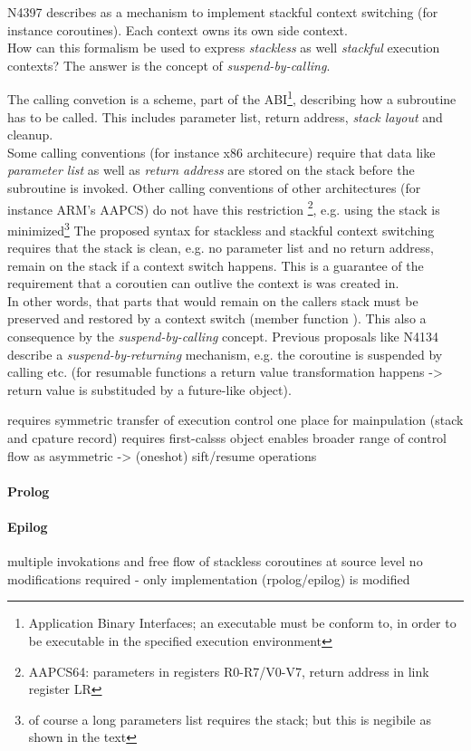 N4397\cite{N4397} describes \ectx as a mechanism to implement stackful context
switching (for instance coroutines). Each context owns its own side context.\\
How can this formalism be used to express \emph{stackless} as well
\emph{stackful} execution contexts? The answer is the concept of
\emph{suspend-by-calling}.

The calling convetion is a scheme, part of the ABI\footnote{Application Binary
Interfaces; an executable must be conform to, in order to be executable in the
specified execution environment}, describing how a subroutine has to be called.
This includes parameter list, return address, \emph{stack layout} and
cleanup.\\
Some calling conventions (for instance x86 architecure) require that data like
\emph{parameter list} as well as \emph{return address} are stored on the
stack before the subroutine is invoked. Other calling conventions of other
architectures (for instance ARM's AAPCS) do not have this restriction
\footnote{AAPCS64: parameters in registers R0-R7/V0-V7, return address in link
register LR}, e.g. using the stack is minimized\footnote{of course a long
parameters list requires the stack; but this is negibile as shown in the text}
\newline
The proposed syntax for stackless and stackful context switching requires that
the stack is clean, e.g. no parameter list and no return address, remain on the
stack if a context switch happens. This is a guarantee of the requirement that
a coroutien can outlive the context is was created in.\\
In other words, that parts that would remain on the callers stack must be
preserved and restored by a context switch (member function \ectxop). This also
a consequence by the \emph{suspend-by-calling} concept. Previous proposals like
N4134\cite{N4134} describe a \emph{suspend-by-returning} mechanism, e.g. the
coroutine is suspended by calling \yield etc. (for resumable functions a return
value transformation happens -> return value is substituded by a future-like
object).

requires symmetric transfer of execution control
one place for mainpulation (stack and cpature record)
requires first-calsss object
enables broader range of control flow as asymmetric -> (oneshot) sift/resume operations
\paragraph*{Prolog}
\paragraph*{Epilog}
multiple invokations and free flow of stackless coroutines
at source level no modifications required - only implementation (rpolog/epilog) is modified
